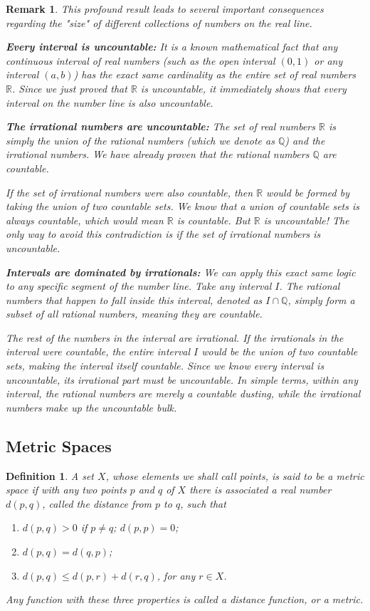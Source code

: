 \documentclass{article}
\theoremstyle{mythm}
\newtheorem{definition}[theorem]{Definition}
\newtheorem{remark}[theorem]{Remark}
\begin{document}
\begin{remark}
This profound result leads to several important consequences regarding the "size" of different collections of numbers on the real line.

\textbf{Every interval is uncountable:} 
It is a known mathematical fact that any continuous interval of real numbers (such as the open interval $(0, 1)$ or any interval $(a, b)$) has the exact same cardinality as the entire set of real numbers $\mathbb{R}$. Since we just proved that $\mathbb{R}$ is uncountable, it immediately shows that every interval on the number line is also uncountable.

\textbf{The irrational numbers are uncountable:} 
The set of real numbers $\mathbb{R}$ is simply the union of the rational numbers (which we denote as $\mathbb{Q}$) and the irrational numbers. We have already proven that the rational numbers $\mathbb{Q}$ are countable. 

If the set of irrational numbers were also countable, then $\mathbb{R}$ would be formed by taking the union of two countable sets. We know that a union of countable sets is always countable, which would mean $\mathbb{R}$ is countable. But $\mathbb{R}$ is uncountable! The only way to avoid this contradiction is if the set of irrational numbers is uncountable.

\textbf{Intervals are dominated by irrationals:} 
We can apply this exact same logic to any specific segment of the number line. Take any interval $I$. The rational numbers that happen to fall inside this interval, denoted as $I \cap \mathbb{Q}$, simply form a subset of all rational numbers, meaning they are countable. 

The rest of the numbers in the interval are irrational. If the irrationals in the interval were countable, the entire interval $I$ would be the union of two countable sets, making the interval itself countable. Since we know every interval is uncountable, its irrational part must be uncountable. In simple terms, within any interval, the rational numbers are merely a countable dusting, while the irrational numbers make up the uncountable bulk.
\end{remark}
\subsection{Metric Spaces}

\begin{definition}
A set $X$, whose elements we shall call \textit{points}, is said to be a \textit{metric space} if with any two points $p$ and $q$ of $X$ there is associated a real number $d(p, q)$, called the \textit{distance} from $p$ to $q$, such that
\begin{enumerate}[label=(\alph*)]
    \item $d(p,q) > 0$ if $p \neq q$; $d(p,p) = 0$;
    \item $d(p,q) = d(q,p)$;
    \item $d(p,q) \le d(p,r) + d(r,q)$, for any $r \in X$.
\end{enumerate}
Any function with these three properties is called a \textit{distance function}, or a \textit{metric}.
\end{definition}
\end{document}
